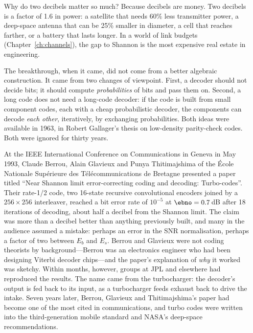 Why do two decibels matter so much? Because decibels are money. Two decibels is a factor of 1.6
in power: a satellite that needs 60\% less transmitter power, a deep-space antenna that can be 25\%
smaller in diameter, a cell that reaches farther, or a battery that lasts longer. In a world of
link budgets (Chapter~\ref{ch:channels}), the gap to Shannon is the most expensive real estate in
engineering.

The breakthrough, when it came, did not come from a better algebraic construction. It came from
two changes of viewpoint. First, a decoder should not decide bits; it should compute
\emph{probabilities} of bits and pass them on. Second, a long code does not need a
long-code decoder: if the code is built from small component codes, each with a cheap
probabilistic decoder, the components can decode \emph{each other}, iteratively, by exchanging
probabilities. Both ideas were available in 1963, in Robert Gallager's thesis on low-density
parity-check codes. Both were ignored for thirty years.


\begin{history}
At the IEEE International Conference on Communications in Geneva in May 1993, Claude Berrou, Alain
Glavieux and Punya Thitimajshima of the \'Ecole Nationale Sup\'erieure des T\'el\'ecommunications
de Bretagne presented a paper titled ``Near Shannon limit error-correcting coding and decoding:
Turbo-codes''. Their rate-1/2 code, two 16-state recursive convolutional encoders joined by a
$256\times256$ interleaver, reached a bit error rate of $10^{-5}$ at $\ebno=0.7$\,dB after 18
iterations of decoding, about half a decibel from the Shannon limit. The claim was more than a
decibel better than anything previously built, and many in the audience assumed a mistake:
perhaps an error in the SNR normalisation, perhaps a factor of two between $E_b$ and $E_s$.
Berrou and Glavieux were not coding theorists by background---Berrou was an electronics engineer
who had been designing Viterbi decoder chips---and the paper's explanation of \emph{why} it worked
was sketchy. Within months, however, groups at JPL and elsewhere had reproduced the results. The
name came from the turbocharger: the decoder's output is fed back to its input, as a turbocharger
feeds exhaust back to drive the intake. Seven years later, Berrou, Glavieux and Thitimajshima's
paper had become one of the most cited in communications, and turbo codes were written into the
third-generation mobile standard and NASA's deep-space recommendations.
\end{history}

